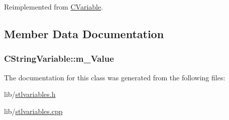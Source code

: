 Reimplemented from \hyperlink{classCVariable_a7c536a5709d8df5d9d75013370288c79}{C\-Variable}.



\subsection{Member Data Documentation}
\hypertarget{classCStringVariable_a18e53ee780ef84bf84c1eca430b592ca}{
\subsubsection[{m\-\_\-\-Value}]{ C\-String\-Variable\-::m\-\_\-\-Value\hspace{0.3cm}{\ttfamily [protected]}}}\label{classCStringVariable_a18e53ee780ef84bf84c1eca430b592ca}


The documentation for this class was generated from the following files\-:\begin{DoxyCompactItemize}
\item 
lib/\hyperlink{stlvariables_8h}{stlvariables.\-h}\item 
lib/\hyperlink{stlvariables_8cpp}{stlvariables.\-cpp}\end{DoxyCompactItemize}
